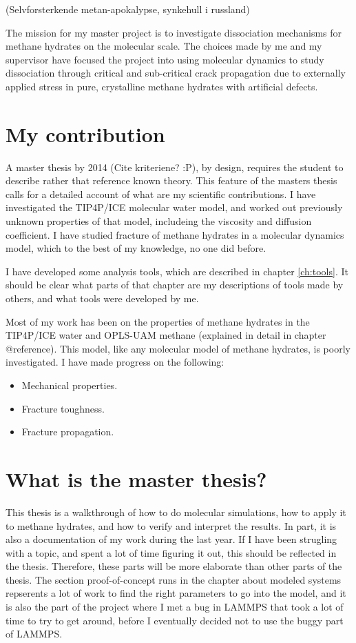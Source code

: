 (Selvforsterkende metan-apokalypse, synkehull i russland)

The mission for my master project is to investigate dissociation mechanisms for methane hydrates on the molecular scale. The choices made by me and my supervisor have focused the project into using molecular dynamics to study dissociation through critical and sub-critical crack propagation due to externally applied stress in pure, crystalline methane hydrates with artificial defects. 


\section{My contribution}
A master thesis by 2014 (Cite kriteriene? :P), by design, requires the student to describe rather that reference known theory. This feature of the masters thesis calls for a detailed account of what are my scientific contributions. I have investigated the TIP4P/ICE molecular water model, and worked out previously unknown properties of that model, includeing the viscosity and diffusion coefficient. I have studied fracture of methane hydrates in a molecular dynamics model, which to the best of my knowledge, no one did before. 

I have developed some analysis tools, which are described in chapter \ref{ch:tools}. It should be clear what parts of that chapter are my descriptions of tools made by others, and what tools were developed by me.

Most of my work has been on the properties of methane hydrates in the  TIP4P/ICE water and OPLS-UAM methane (explained in detail in chapter @reference). This model, like any molecular model of methane hydrates, is poorly investigated. I have made progress on the following:
\begin{itemize}
\item Mechanical properties.
\item Fracture toughness.
\item Fracture propagation.
\end{itemize}


\section{What is the master thesis?}
This thesis is a walkthrough of how to do molecular simulations, how to apply it to methane hydrates, and how to verify and interpret the results. In part, it is also a documentation of my work during the last year. If I have been strugling with a topic, and spent a lot of time figuring it out, this should be reflected in the thesis. Therefore, these parts will be more elaborate than other parts of the thesis. The section proof-of-concept runs in the chapter about modeled systems repserents a lot of work to find the right parameters to go into the model, and it is also the part of the project where I met a bug in LAMMPS that took a lot of time to try to get around, before I eventually decided not to use the buggy part of LAMMPS.


